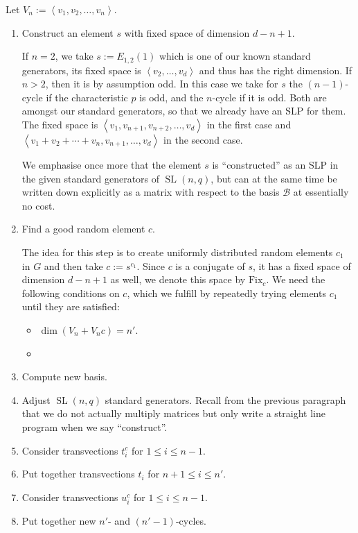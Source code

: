 \documentclass[a4paper,11pt]{article}
\def\SL{\operatorname{SL}}
\newcommand{\Fix}{\mathrm{Fix}}
\newcommand{\B}{\mathcal{B}}
\begin{document}
Let $V_n := \left< v_1, v_2, \ldots, v_n\right>$.

\smallskip
\begin{enumerate}
\item Construct an element $s$ with fixed space of dimension $d-n+1$.

If $n=2$, we take $s := E_{1,2}(1)$ which is one of our known standard
generators, its fixed space is $\left< v_2, \ldots, v_d\right>$ and thus
has the right dimension. If $n > 2$, then it is by assumption odd.
In this case we take for $s$ the $(n-1)$-cycle if the characteristic $p$
is odd, and the $n$-cycle if it is odd. Both are amongst our
standard generators, so that we already have an SLP for them. The fixed
space is $\left< v_1, v_{n+1}, v_{n+2}, \ldots, v_d\right>$ in the first
case and $\left< v_1+v_2+\cdots+v_n, v_{n+1}, \ldots, v_d\right>$ in the
second case.

We emphasise once more that the element $s$ is ``constructed'' as an SLP in
the given standard generators of $\SL(n,q)$, but can at the same time be
written down explicitly as a matrix with respect to the basis $\B$ at
essentially no cost.
\item Find a good random element $c$.

The idea for this step is to create uniformly distributed random elements 
$c_1$ in $G$ and then take $c := s^{c_1}$. Since $c$ is a conjugate of $s$,
it has a fixed space of dimension $d-n+1$ as well, we denote this space
by $\Fix_c$. We need the following
conditions on $c$, which we fulfill by repeatedly trying elements $c_1$
until they are satisfied:
\begin{itemize}
\item $\dim(V_n + V_n c) = n'$.
\item 
\end{itemize}
\item Compute new basis.
\item Adjust $\SL(n,q)$ standard generators.
Recall from the previous paragraph that we do not actually multiply
matrices but only write a straight line program when we say ``construct''.
\item Consider transvections $t_i^c$ for $1 \le i \le n-1$.
\item Put together transvections $t_i$ for $n+1 \le i \le n'$.
\item Consider transvections $u_i^c$ for $1 \le i \le n-1$.
\item Put together new $n'$- and $(n'-1)$-cycles.
\end{enumerate}
\end{document}
